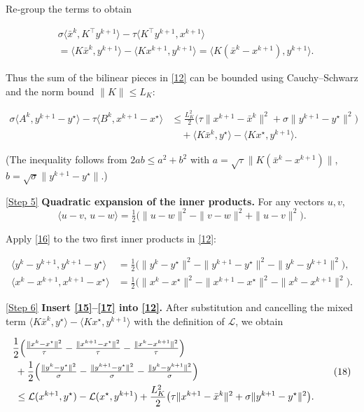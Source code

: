 \documentclass{article}
\begin{document}
Re‑group the terms to obtain  

\[
\begin{aligned}
&\sigma\langle \bar x^{k},K^{\!\top}y^{k+1}\rangle
-\tau\langle K^{\!\top}y^{k+1},x^{k+1}\rangle \\
&= \langle K\bar x^{k},y^{k+1}\rangle
   -\langle Kx^{k+1},y^{k+1}\rangle
 = \langle K(\bar x^{k}-x^{k+1}),y^{k+1}\rangle .
\end{aligned}
\tag{14}
\]

Thus the sum of the bilinear pieces in \eqref{12} can be bounded using Cauchy–Schwarz and the norm bound $\|K\|\le L_K$:

\[
\begin{aligned}
\sigma\langle A^{k},y^{k+1}-y^{\star}\rangle
-\tau\langle B^{k},x^{k+1}-x^{\star}\rangle
&\le \frac{L_K^{2}}{2}\bigl(\tau\|x^{k+1}-\bar x^{k}\|^{2}
                         +\sigma\|y^{k+1}-y^{\star}\|^{2}\bigr) \\
&\quad +\langle K\bar x^{k},y^{\star}\rangle
      -\langle Kx^{\star},y^{k+1}\rangle .
\end{aligned}
\tag{15}
\]

(The inequality follows from $2ab\le a^{2}+b^{2}$ with $a=\sqrt{\tau}\|K(\bar x^{k}-x^{k+1})\|$, $b=\sqrt{\sigma}\|y^{k+1}-y^{\star}\|$.)

\noindent\underline{[Step 5]} \textbf{Quadratic expansion of the inner products.}  
For any vectors $u,v$,
\[
\langle u-v,\,u-w\rangle = \tfrac12\bigl(\|u-w\|^{2}-\|v-w\|^{2}+\|u-v\|^{2}\bigr).
\tag{16}
\]

Apply \eqref{16} to the two first inner products in \eqref{12}:

\[
\begin{aligned}
\langle y^{k}-y^{k+1},y^{k+1}-y^{\star}\rangle
&=\tfrac12\bigl(\|y^{k}-y^{\star}\|^{2}-\|y^{k+1}-y^{\star}\|^{2}
               -\|y^{k}-y^{k+1}\|^{2}\bigr),\\
\langle x^{k}-x^{k+1},x^{k+1}-x^{\star}\rangle
&=\tfrac12\bigl(\|x^{k}-x^{\star}\|^{2}-\|x^{k+1}-x^{\star}\|^{2}
               -\|x^{k}-x^{k+1}\|^{2}\bigr).
\end{aligned}
\tag{17}
\]

\noindent\underline{[Step 6]} \textbf{Insert \eqref{15}–\eqref{17} into \eqref{12}.}  
After substitution and cancelling the mixed term $\langle K\bar x^{k},y^{\star}\rangle-\langle Kx^{\star},y^{k+1}\rangle$ with the definition of $\mathcal L$, we obtain

\[
\begin{aligned}
&\frac{1}{2}\Bigl(\tfrac{\|x^{k}-x^{\star}\|^{2}}{\tau}
                 -\tfrac{\|x^{k+1}-x^{\star}\|^{2}}{\tau}
                 -\tfrac{\|x^{k}-x^{k+1}\|^{2}}{\tau}\Bigr)\\
&\;+\frac{1}{2}\Bigl(\tfrac{\|y^{k}-y^{\star}\|^{2}}{\sigma}
                 -\tfrac{\|y^{k+1}-y^{\star}\|^{2}}{\sigma}
                 -\tfrac{\|y^{k}-y^{k+1}\|^{2}}{\sigma}\Bigr)\\
&\;\le \mathcal L(x^{k+1},y^{\star})-\mathcal L(x^{\star},y^{k+1})
      +\frac{L_K^{2}}{2}\bigl(\tau\|x^{k+1}-\bar x^{k}\|^{2}
                            +\sigma\|y^{k+1}-y^{\star}\|^{2}\bigr).
\end{aligned}
\tag{18}
\]
\end{document}

